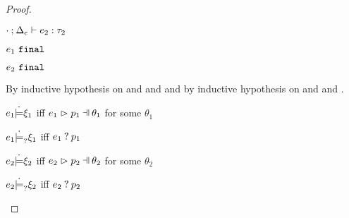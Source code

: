 \begin{proof}
\begin{byCases}
\begin{byCases}
\begin{pfsteps*}
        \item $\cdot \mathbin{;} \Delta_e \vdash e_2 : \tau_2$  
        \item $e_1 ~\mathtt{final}$  
        \item $e_2 ~\mathtt{final}$  
        \end{pfsteps*}
        By inductive hypothesis on  and  and  and by inductive hypothesis on  and  and .
        \begin{pfsteps*}
        \item $e_1 \dot{\models} \xi_1$ iff $\hpatmatch{e_1}{p_1}{\theta_1}$ for some $\theta_1$ 
        \item $e_1 \dot{\models}_{?} \xi_1$ iff $e_1 \mathbin{?} p_1$ 
        \item $e_2 \dot{\models} \xi_2$ iff $\hpatmatch{e_2}{p_2}{\theta_2}$ for some $\theta_2$ 
        \item $e_2 \dot{\models}_{?} \xi_2$ iff $e_2 \mathbin{?} p_2$ 
        \end{pfsteps*}
        

\end{byCases}
\end{byCases}
\end{proof}
